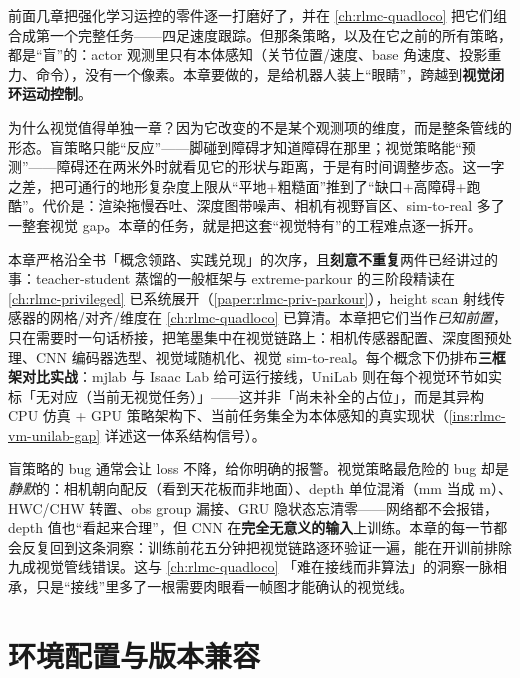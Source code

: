 前面几章把强化学习运控的零件逐一打磨好了，并在 \cref{ch:rlmc-quadloco} 把它们组合成第一个完整任务——四足速度跟踪。但那条策略，以及在它之前的所有策略，都是“盲”的：actor 观测里只有本体感知（关节位置/速度、base 角速度、投影重力、命令），没有一个像素。本章要做的，是给机器人装上“眼睛”，跨越到\textbf{视觉闭环运动控制}。

为什么视觉值得单独一章？因为它改变的不是某个观测项的维度，而是整条管线的形态。盲策略只能“反应”——脚碰到障碍才知道障碍在那里；视觉策略能“预测”——障碍还在两米外时就看见它的形状与距离，于是有时间调整步态。这一字之差，把可通行的地形复杂度上限从“平地+粗糙面”推到了“缺口+高障碍+跑酷”。代价是：渲染拖慢吞吐、深度图带噪声、相机有视野盲区、sim-to-real 多了一整套视觉 gap。本章的任务，就是把这套“视觉特有”的工程难点逐一拆开。

本章严格沿全书「概念领路、实践兑现」的次序，且\textbf{刻意不重复}两件已经讲过的事：teacher-student 蒸馏的一般框架与 extreme-parkour 的三阶段精读在 \cref{ch:rlmc-privileged} 已系统展开（\cref{paper:rlmc-priv-parkour}），height scan 射线传感器的网格/对齐/维度在 \cref{ch:rlmc-quadloco} 已算清。本章把它们当作\emph{已知前置}，只在需要时一句话桥接，把笔墨集中在视觉链路上：相机传感器配置、深度图预处理、CNN 编码器选型、视觉域随机化、视觉 sim-to-real。每个概念下仍排布\textbf{三框架对比实战}：mjlab 与 Isaac Lab 给可运行接线，UniLab 则在每个视觉环节如实标「无对应（当前无视觉任务）」——这并非「尚未补全的占位」，而是其异构 CPU 仿真 + GPU 策略架构下、当前任务集全为本体感知的真实现状（\cref{ins:rlmc-vm-unilab-gap} 详述这一体系结构信号）。

\begin{insight}\label{ins:rlmc-vm-plumbing}
盲策略的 bug 通常会让 loss 不降，给你明确的报警。视觉策略最危险的 bug 却是\emph{静默}的：相机朝向配反（看到天花板而非地面）、depth 单位混淆（mm 当成 m）、HWC/CHW 转置、obs group 漏接、GRU 隐状态忘清零——网络都不会报错，depth 值也“看起来合理”，但 CNN 在\textbf{完全无意义的输入}上训练。本章的每一节都会反复回到这条洞察：训练前花五分钟把视觉链路逐环验证一遍，能在开训前排除九成视觉管线错误。这与 \cref{ch:rlmc-quadloco} 「难在接线而非算法」的洞察一脉相承，只是“接线”里多了一根需要肉眼看一帧图才能确认的视觉线。
\end{insight}

\section{环境配置与版本兼容}
\label{sec:rlmc-vm-setup}

